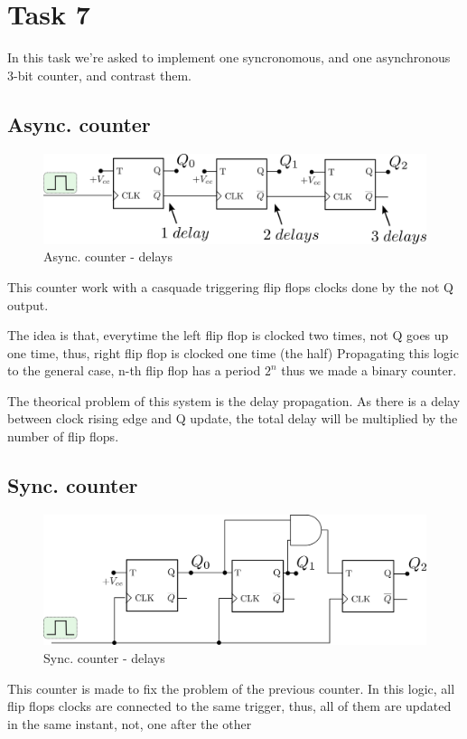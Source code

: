\newpage

\section*{Task 7}

In this task we're asked to implement one syncronomous, and one asynchronous 3-bit counter, and contrast them.

\subsection*{Async. counter}
\begin{figure}[H]
    \begin{centering}
    \includegraphics[width=1\textwidth]{data/async.png}
    \par\end{centering}
    \caption{Async. counter - delays}
\end{figure}


This counter work with a casquade triggering flip flops clocks done by the not Q output.

The idea is that, everytime the left flip flop is clocked two times, not Q goes up one time, thus, right flip flop is clocked one time (the half)
Propagating this logic to the general case, n-th flip flop has a period $2^n$ thus we made a binary counter. 

The theorical problem of this system is the delay propagation. As there is a delay between clock rising edge and Q update, the total delay will be multiplied by the number of flip flops.

\subsection*{Sync. counter}
\begin{figure}[H]
    \begin{centering}
    \includegraphics[width=1\textwidth]{data/sync.png}
    \par\end{centering}
    \caption{Sync. counter - delays}
\end{figure}

This counter is made to fix the problem of the previous counter. In this logic, all flip flops clocks are connected to the same trigger, thus, all of them are updated in the same instant, not, one after the other
